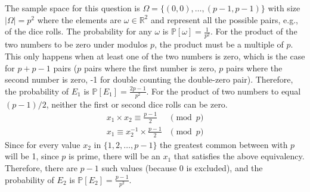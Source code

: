 \documentclass[11pt]{article}
\begin{document}
\begin{solution}

\begin{Parts}
\Part The sample space for this question is $\Omega = \{ (0, 0), \dots, (p-1, p-1)
\}$ with size $|\Omega| = p^2$ where the elements are $\omega \in \mathbb{R}^2$
and represent all the possible pairs, e.g., of the dice rolls. The probability for
any $\omega$ is $\mathbb{P}[\omega] = \frac{1}{p^2}$. For the product of the two
numbers to be zero under modulos $p$, the product must be a multiple of $p$. 
This only happens when at least one of the two numbers is zero, which is the case
for $p + p - 1$ pairs ($p$ pairs where the first number is zero, $p$ pairs where
the second number is zero, -1 for double counting the double-zero pair). Therefore,
the probability of $E_1$ is $\mathbb{P}[E_1] = \frac{2p-1}{p^2}$. For the product
of two numbers to equal $(p-1)/2$, neither the first or second dice rolls can be
zero. 
\[
    \begin{split}
        x_1 \times x_2 \equiv \frac{p-1}{2} &\pmod{p} \\
        x_1 \equiv x_2^{-1} \times \frac{p-1}{2} &\pmod{p}
    \end{split}
\]
Since for every value $x_2$ in $\{ 1, 2, \dots, p-1 \}$ the greatest common
between with $p$ will be 1, since $p$ is prime, there will be an $x_1$ that
satisfies the above equivalency. Therefore, there are $p-1$ such values (because
0 is excluded), and the probability of $E_2$ is $\mathbb{P}[E_2] = \frac{p-1}{p^2}$.

\Part 


\end{Parts}

\end{solution}
\end{document}
